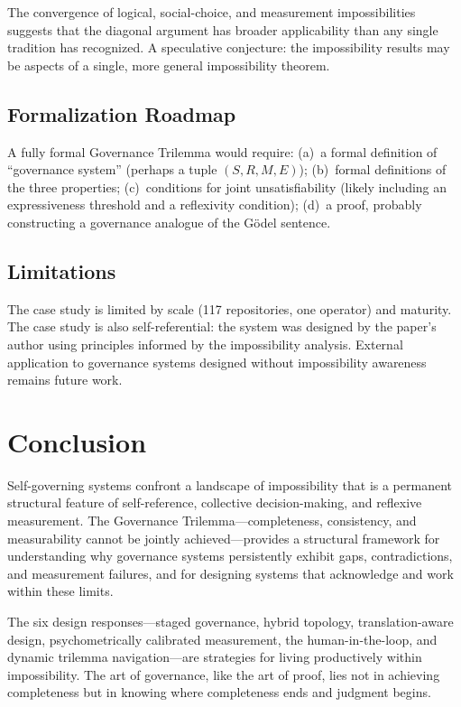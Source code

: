 \documentclass[12pt,a4paper]{article}
\begin{document}
The convergence of logical, social-choice, and measurement impossibilities
suggests that the diagonal argument has broader applicability than any single
tradition has recognized. A speculative conjecture: the impossibility results
may be aspects of a single, more general impossibility theorem.

\subsection{Formalization Roadmap}

A fully formal Governance Trilemma would require: (a)~a formal definition of
``governance system'' (perhaps a tuple $(S, R, M, E)$); (b)~formal
definitions of the three properties; (c)~conditions for joint
unsatisfiability (likely including an expressiveness threshold and a
reflexivity condition); (d)~a proof, probably constructing a governance
analogue of the G\"{o}del sentence.

\subsection{Limitations}

The case study is limited by scale (117 repositories, one operator) and
maturity. The case study is also self-referential: the system was designed
by the paper's author using principles informed by the impossibility analysis.
External application to governance systems designed without impossibility
awareness remains future work.

\section{Conclusion}

Self-governing systems confront a landscape of impossibility that is a
permanent structural feature of self-reference, collective decision-making,
and reflexive measurement. The Governance Trilemma---completeness, consistency,
and measurability cannot be jointly achieved---provides a structural framework
for understanding why governance systems persistently exhibit gaps,
contradictions, and measurement failures, and for designing systems that
acknowledge and work within these limits.

The six design responses---staged governance, hybrid topology,
translation-aware design, psychometrically calibrated measurement, the
human-in-the-loop, and dynamic trilemma navigation---are strategies for living
productively within impossibility. The art of governance, like the art of
proof, lies not in achieving completeness but in knowing where completeness
ends and judgment begins.
\end{document}
